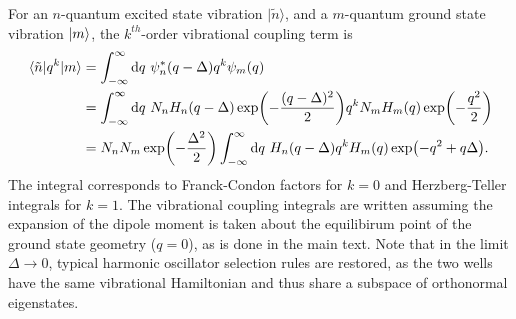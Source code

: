 \documentclass[aip, jcp, reprint, onecolumn, nofootinbib]{revtex4-2}
\begin{document}
For an $n$-quantum excited state vibration $| \tilde{n} \rangle$, and a $m$-quantum ground state vibration $\ket{m}$, the $k^{th}$-order vibrational coupling term is
\begin{equation}
	\begin{split}
		\mel{\tilde{n}}{q^k}{m} &= \int_{-\infty}^\infty \mathrm{d}q \ \psi^*_n(q-\Delta) q^k \psi_m(q)\\
		&= \int_{-\infty}^\infty \mathrm{d}q \ N_n H_n(q-\Delta) \exp(-\frac{(q - \Delta)^2}{2}) q^k N_m H_m(q) \exp(-\frac{q^2}{2}) \\
		&= N_n N_m \exp(-\frac{\Delta^2}{2}) \int_{-\infty}^\infty \mathrm{d}q \ H_n(q-\Delta) q^k H_m(q) \exp(-q^2 + q\Delta).
	\end{split}\label{key}
\end{equation}
The integral corresponds to Franck-Condon factors for $k=0$ and Herzberg-Teller integrals for $k=1$.
The vibrational coupling integrals are written assuming the expansion of the dipole moment is taken about the equilibirum point of the ground state geometry ($q=0$), as is done in the main text.
Note that in the limit $\Delta \rightarrow 0$, typical harmonic oscillator selection rules are restored, as the two wells have the same vibrational Hamiltonian and thus share a subspace of orthonormal eigenstates.
\end{document}
